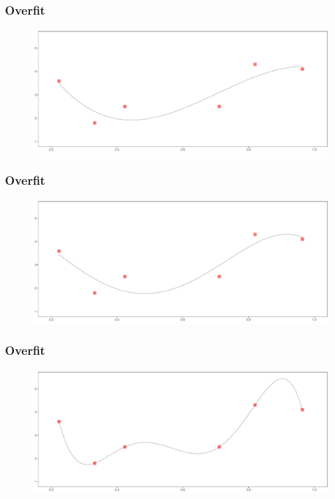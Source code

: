 \documentclass[
  shownotes,
  xcolor={svgnames},
  hyperref={colorlinks,citecolor=DarkBlue,linkcolor=DarkRed,urlcolor=DarkBlue}
  , aspectratio=169]{beamer}
\begin{document}
\begin{frame}
\frametitle{Overfit}


        \begin{figure}[H] \centering
            \captionsetup{justification=centering}
              \includegraphics[scale=0.4]{figures/fig_1d.pdf}
 \end{figure}

\end{frame}
\begin{frame}
\frametitle{Overfit}


        \begin{figure}[H] \centering
            \captionsetup{justification=centering}
              \includegraphics[scale=0.4]{figures/fig_1e.pdf}
 \end{figure}

\end{frame}
\begin{frame}
\frametitle{Overfit}


        \begin{figure}[H] \centering
            \captionsetup{justification=centering}
              \includegraphics[scale=0.4]{figures/fig_1f.pdf}
 \end{figure}

\end{frame}
\end{document}
